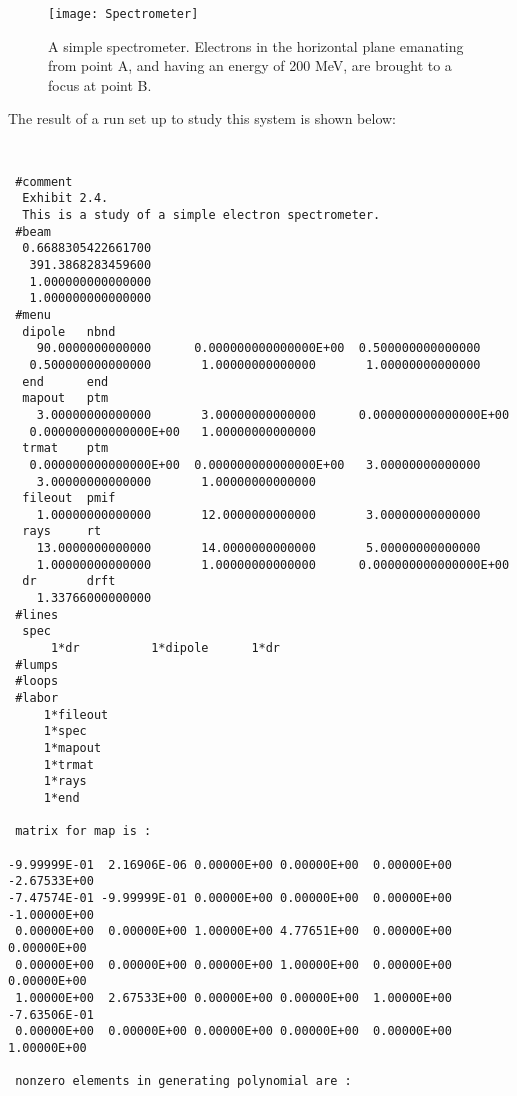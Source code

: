 \begin{figure}[htp]
  \centering
  \texttt{[image: Spectrometer]}
  \caption{A simple spectrometer.  Electrons in the
           horizontal plane emanating from point A, and having an
           energy of 200 MeV, are brought to a focus at point B.}
\end{figure}

     The result of a  run set up to study this system is shown
below:

{
\footnotesize\tt
\begin{verbatim}
 #comment
  Exhibit 2.4.
  This is a study of a simple electron spectrometer.
 #beam
  0.6688305422661700
   391.3868283459600
   1.000000000000000
   1.000000000000000
 #menu
  dipole   nbnd
    90.0000000000000      0.000000000000000E+00  0.500000000000000
   0.500000000000000       1.00000000000000       1.00000000000000
  end      end
  mapout   ptm
    3.00000000000000       3.00000000000000      0.000000000000000E+00
   0.000000000000000E+00   1.00000000000000
  trmat    ptm
   0.000000000000000E+00  0.000000000000000E+00   3.00000000000000
    3.00000000000000       1.00000000000000
  fileout  pmif
    1.00000000000000       12.0000000000000       3.00000000000000
  rays     rt
    13.0000000000000       14.0000000000000       5.00000000000000
    1.00000000000000       1.00000000000000      0.000000000000000E+00
  dr       drft
    1.33766000000000
 #lines
  spec
      1*dr          1*dipole      1*dr
 #lumps
 #loops
 #labor
     1*fileout
     1*spec
     1*mapout
     1*trmat
     1*rays
     1*end

 matrix for map is :

-9.99999E-01  2.16906E-06 0.00000E+00 0.00000E+00  0.00000E+00 -2.67533E+00
-7.47574E-01 -9.99999E-01 0.00000E+00 0.00000E+00  0.00000E+00 -1.00000E+00
 0.00000E+00  0.00000E+00 1.00000E+00 4.77651E+00  0.00000E+00  0.00000E+00
 0.00000E+00  0.00000E+00 0.00000E+00 1.00000E+00  0.00000E+00  0.00000E+00
 1.00000E+00  2.67533E+00 0.00000E+00 0.00000E+00  1.00000E+00 -7.63506E-01
 0.00000E+00  0.00000E+00 0.00000E+00 0.00000E+00  0.00000E+00  1.00000E+00

 nonzero elements in generating polynomial are :


\end{verbatim}}
